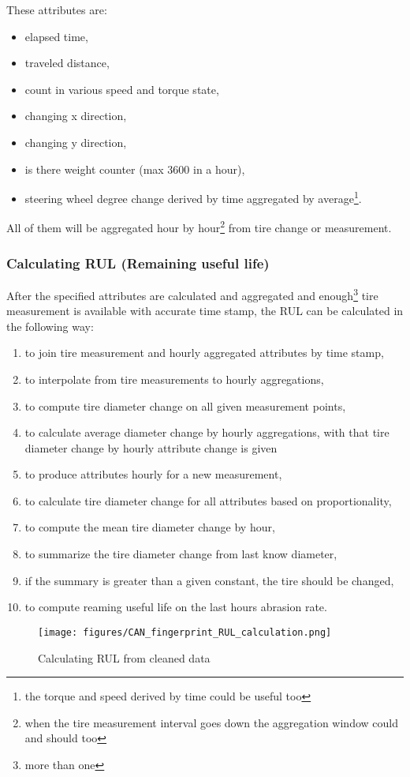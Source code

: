 	These attributes are:
	\begin{itemize}
		\item{elapsed time,} 
		\item{traveled distance,} 
		\item{count in various speed and torque state,}
		\item{changing x direction,}
		\item{changing y direction,}
		\item{is there weight counter (max 3600 in a hour),}
		\item{steering wheel degree change derived by time aggregated by average\footnote{the torque and speed derived by time could be useful too}.}
	\end{itemize}
	All of them will be aggregated hour by hour\footnote{when the tire measurement interval goes down the aggregation window could and should too} from tire change or measurement.
	\subsubsection{Calculating RUL (Remaining useful life)}
	After the specified attributes are calculated and aggregated and enough\footnote{more than one} tire measurement is available with accurate time stamp, the RUL can be calculated in the following way:

	\begin{enumerate}
		\item{to join tire measurement and hourly aggregated attributes by time stamp,}
		\item{to interpolate from tire measurements to hourly aggregations,}
		\item{to compute tire diameter change on all given measurement points,}
		\item{to calculate average diameter change by hourly aggregations,} with that tire diameter change by hourly attribute change is given
		\item{to produce attributes hourly for a new measurement,}
		\item{to calculate tire diameter change for all attributes based on proportionality,}
		\item{to compute the mean tire diameter change by hour,}
		\item{to summarize the tire diameter change from last know diameter,}
		\item{if the summary is greater than a given constant, the tire should be changed,}
		\item{to compute reaming useful life on the last hours abrasion rate.}
	\end{enumerate}
	\begin{figure}[!ht]
		\centering
		\texttt{[image: figures/CAN\_fingerprint\_RUL\_calculation.png]}
		\caption{Calculating RUL from cleaned data} 
	\end{figure}
